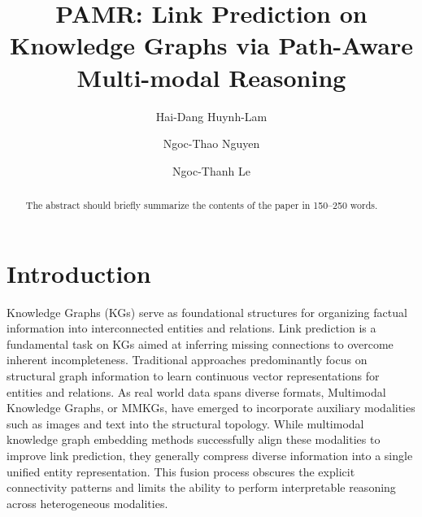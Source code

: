 \documentclass[runningheads]{llncs}
\begin{document}
%
\title{PAMR: Link Prediction on Knowledge Graphs via Path-Aware Multi-modal Reasoning}
%
%
\author{Hai-Dang Huynh-Lam \and
  Ngoc-Thao Nguyen \and
Ngoc-Thanh Le}
%
%
%
\maketitle  %
%
\begin{abstract}
  The abstract should briefly summarize the contents of the paper in
  150--250 words.

\end{abstract}
%
%
%

\section{Introduction}
\label{sec:introduction}

Knowledge Graphs (KGs) serve as foundational structures for organizing factual information into interconnected entities and relations. Link prediction is a fundamental task on KGs aimed at inferring missing connections to overcome inherent incompleteness. Traditional approaches predominantly focus on structural graph information to learn continuous vector representations for entities and relations. As real world data spans diverse formats, Multimodal Knowledge Graphs, or MMKGs, have emerged to incorporate auxiliary modalities such as images and text into the structural topology. While multimodal knowledge graph embedding methods successfully align these modalities to improve link prediction, they generally compress diverse information into a single unified entity representation. This fusion process obscures the explicit connectivity patterns and limits the ability to perform interpretable reasoning across heterogeneous modalities.
\end{document}

